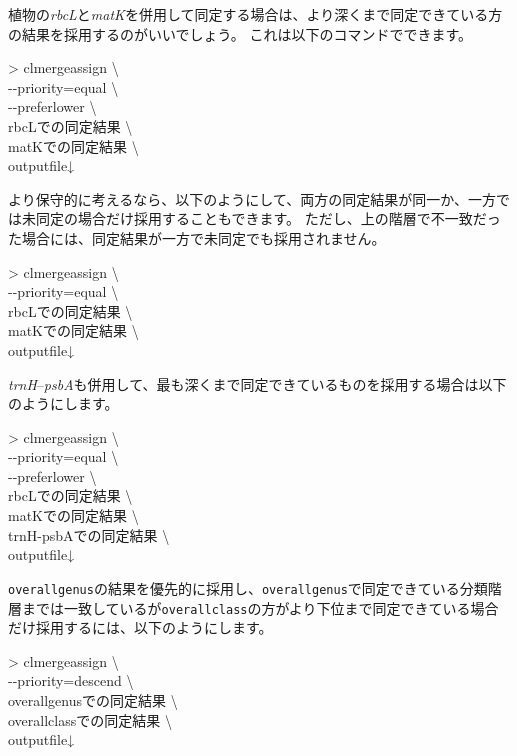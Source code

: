 \documentclass[titlepage,10pt,a4paper,english]{jsbook}
\newenvironment{cmd}{\begin{oframed}\raggedright\ttfamily\footnotesize\setlength{\baselineskip}{1.4em}}{\end{oframed}\vspace{-1em}}
\begin{document}
植物の\textit{rbcL}と\textit{matK}を併用して同定する場合は、より深くまで同定できている方の結果を採用するのがいいでしょう。
これは以下のコマンドでできます。
\begin{cmd}
{\textgreater} clmergeassign {\textbackslash}\\
{-}{-}priority=equal {\textbackslash}\\
{-}{-}preferlower {\textbackslash}\\
rbcLでの同定結果 {\textbackslash}\\
matKでの同定結果 {\textbackslash}\\
outputfile↓
\end{cmd}
より保守的に考えるなら、以下のようにして、両方の同定結果が同一か、一方では未同定の場合だけ採用することもできます。
ただし、上の階層で不一致だった場合には、同定結果が一方で未同定でも採用されません。
\begin{cmd}
{\textgreater} clmergeassign {\textbackslash}\\
{-}{-}priority=equal {\textbackslash}\\
rbcLでの同定結果 {\textbackslash}\\
matKでの同定結果 {\textbackslash}\\
outputfile↓
\end{cmd}
\textit{trnH}--\textit{psbA}も併用して、最も深くまで同定できているものを採用する場合は以下のようにします。
\begin{cmd}
{\textgreater} clmergeassign {\textbackslash}\\
{-}{-}priority=equal {\textbackslash}\\
{-}{-}preferlower {\textbackslash}\\
rbcLでの同定結果 {\textbackslash}\\
matKでの同定結果 {\textbackslash}\\
trnH-psbAでの同定結果 {\textbackslash}\\
outputfile↓
\end{cmd}
\texttt{overall{\textunderscore}genus}の結果を優先的に採用し、\texttt{overall{\textunderscore}genus}で同定できている分類階層までは一致しているが\texttt{overall{\textunderscore}class}の方がより下位まで同定できている場合だけ採用するには、以下のようにします。
\begin{cmd}
{\textgreater} clmergeassign {\textbackslash}\\
{-}{-}priority=descend {\textbackslash}\\
overall{\textunderscore}genusでの同定結果 {\textbackslash}\\
overall{\textunderscore}classでの同定結果 {\textbackslash}\\
outputfile↓
\end{cmd}
\end{document}

